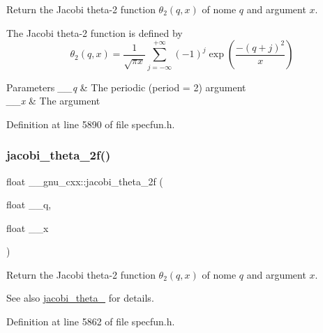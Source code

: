 Return the Jacobi theta-\/2 function $ \theta_2(q,x) $ of nome $ q $ and argument $ x $.

The Jacobi theta-\/2 function is defined by \[ \theta_2(q,x) = \frac{1}{\sqrt{\pi x}} \sum_{j=-\infty}^{+\infty} (-1)^j \exp\left( \frac{-(q + j)^2}{x} \right) \]


\begin{DoxyParams}{Parameters}
{\em \+\_\+\+\_\+q} & The periodic (period = 2) argument \\
\hline
{\em \+\_\+\+\_\+x} & The argument \\
\hline
\end{DoxyParams}


Definition at line 5890 of file specfun.\+h.

\mbox{\label{group__gnu__math__spec__func_gaa99e91c0753410a42b57cbf417cf7ea0}} 
\subsubsection{\texorpdfstring{jacobi\+\_\+theta\+\_\+2f()}{jacobi\_theta\_2f()}}
{\footnotesize\ttfamily float \+\_\+\+\_\+gnu\+\_\+cxx\+::jacobi\+\_\+theta\+\_\+2f (\begin{DoxyParamCaption}\item[{float}]{\+\_\+\+\_\+q,  }\item[{float}]{\+\_\+\+\_\+x }\end{DoxyParamCaption})\hspace{0.3cm}{\ttfamily [inline]}}

Return the Jacobi theta-\/2 function $ \theta_2(q,x) $ of nome $ q $ and argument $ x $.

\begin{DoxySeeAlso}{See also}
\hyperlink{group__gnu__math__spec__func_gaf6b13dac1f112a870299d75cb4cf42cc}{jacobi\+\_\+theta\+\_} for details. 
\end{DoxySeeAlso}


Definition at line 5862 of file specfun.\+h.

\mbox{\label{group__gnu__math__spec__func_ga2db5cb3025b9068e79dc7aa21bc9af5b}} 
